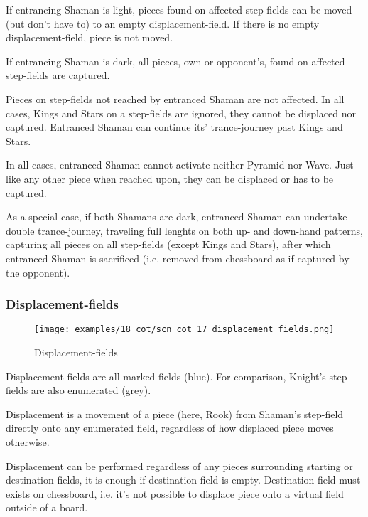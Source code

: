 If entrancing Shaman is light, pieces found on affected step-fields can be moved
(but don't have to) to an empty displacement-field. If there is no empty
displacement-field, piece is not moved.

If entrancing Shaman is dark, all pieces, own or opponent's, found on affected
step-fields are captured.

Pieces on step-fields not reached by entranced Shaman are not affected. In all
cases, Kings and Stars on a step-fields are ignored, they cannot be displaced
nor captured. Entranced Shaman can continue its' trance-journey past Kings and Stars.

In all cases, entranced Shaman cannot activate neither Pyramid nor Wave. Just like
any other piece when reached upon, they can be displaced or has to be captured.

As a special case, if both Shamans are dark, entranced Shaman can undertake double
trance-journey, traveling full lenghts on both up- and down-hand patterns, capturing
all pieces on all step-fields (except Kings and Stars), after which entranced Shaman
is sacrificed (i.e. removed from chessboard as if captured by the opponent).

\clearpage %

\subsubsection*{Displacement-fields}

\noindent
\begin{figure}[!h]
\texttt{[image: examples/18\_cot/scn\_cot\_17\_displacement\_fields.png]}
\caption{Displacement-fields}
\label{fig:scn_cot_17_displacement_fields}
\end{figure}

Displacement-fields are all marked fields (blue). For comparison, Knight's
step-fields are also enumerated (grey).

Displacement is a movement of a piece (here, Rook) from Shaman's step-field directly
onto any enumerated field, regardless of how displaced piece moves otherwise.

Displacement can be performed regardless of any pieces surrounding starting or
destination fields, it is enough if destination field is empty. Destination field
must exists on chessboard, i.e. it's not possible to displace piece onto a virtual
field outside of a board.

